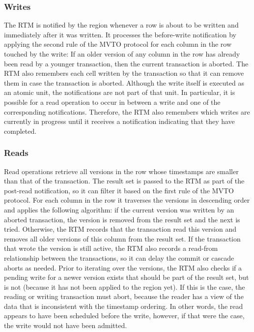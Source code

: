 \documentclass[10pt,final,journal]{IEEEtran}
\begin{document}
\subsubsection{Writes}
The RTM is notified by the region whenever a row is about to be written and immediately after it was written. It processes the before-write notification by applying the second rule of the MVTO protocol for each column in the row touched by the write: If an older version of any column in the row has already been read by a younger transaction, then the current transaction is aborted. The RTM also remembers each cell written by the transaction so that it can remove them in case the transaction is aborted. Although the write itself is executed as an atomic unit, the notifications are not part of that unit. In particular, it is possible for a read operation to occur in between a write and one of the corresponding notifications. Therefore, the RTM also remembers which writes are currently in progress until it receives a notification indicating that they have completed.

\subsubsection{Reads}
Read operations retrieve all versions in the row whose timestamps are smaller than that of the transaction. The result set is passed to the RTM as part of the post-read notification, so it can filter it based on the first rule of the MVTO protocol. For each column in the row it traverses the versions in descending order and applies the following algorithm: if the current version was written by an aborted transaction, the version is removed from the result set and the next is tried. Otherwise, the RTM records that the transaction read this version and removes all older versions of this column from the result set. If the transaction that wrote the version is still active, the RTM also records a read-from relationship between the transactions, so it can delay the commit or cascade aborts as needed. Prior to iterating over the versions, the RTM also checks if a pending write for a newer version exists that should be part of the result set, but is not (because it has not been applied to the region yet). If this is the case, the reading or writing transaction must abort, because the reader has a view of the data that is inconsistent with the timestamp ordering. In other words, the read appears to have been scheduled before the write, however, if that were the case, the write would not have been admitted.
\end{document}
